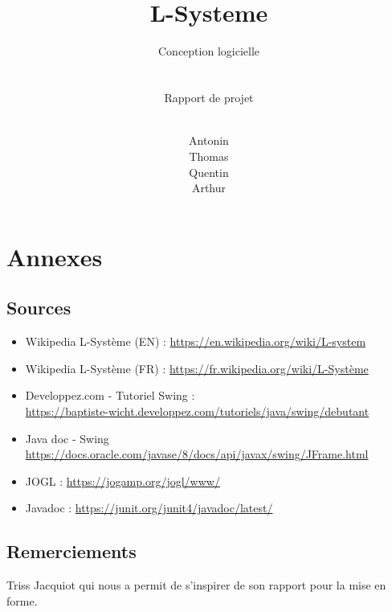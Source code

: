 \documentclass[
	headsepline=on,
	footsepline=on,
	twoside=off,
	abstract=on,
	DIV=10
]{scrreprt}
\title{
	\hrulefill
	\vfill\\
	\Huge \bfseries\\L-Systeme
}
\subtitle{
	Conception logicielle\\
	\hfill\\
	\hrulefill
	\hfill\\
	{\normalfont Rapport de projet}
}
\author{
	\small
	\hfill\\
	Antonin \bsc{Boyon}\\
    Thomas \bsc{Lalong}\\ 
    Quentin \bsc{Legot}\\
    Arthur \bsc{Page}\\
}
\date{}
\begin{document}
\maketitle

\tableofcontents

\listoffigures
\clearpage
{}
	
 
	
	
	
	
	\cleardoublepage
	\pagebreak
	
	\chapter{Annexes}
	    \section{Sources}
	    \begin{itemize}[label=\textbullet]
	        \item Wikipedia L-Système (EN) : \href{https://en.wikipedia.org/wiki/L-system}{https://en.wikipedia.org/wiki/L-system}
	        \item Wikipedia L-Système (FR) : \href{https://fr.wikipedia.org/wiki/L-Syst\%C3\%A8me}{https://fr.wikipedia.org/wiki/L-Système}
	        \item Developpez.com - Tutoriel Swing :\\
	        \href{https://baptiste-wicht.developpez.com/tutoriels/java/swing/debutant}{https://baptiste-wicht.developpez.com/tutoriels/java/swing/debutant}
	        \item Java doc - Swing
	        \href{https://docs.oracle.com/javase/8/docs/api/javax/swing/JFrame.html}{https://docs.oracle.com/javase/8/docs/api/javax/swing/JFrame.html}
	        \item JOGL : \href{https://jogamp.org/jogl/www/}{https://jogamp.org/jogl/www/}
	        \item Javadoc : \href{https://junit.org/junit4/javadoc/latest/}{https://junit.org/junit4/javadoc/latest/}
	    \end{itemize}
        \section{Remerciements}
		    Triss Jacquiot qui nous a permit de s'inspirer de son rapport pour la mise en forme.
		    
	
\end{document}
